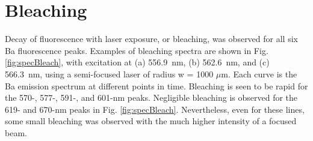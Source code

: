 


\section{Bleaching}
\label{sec:bleaching}

Decay of fluorescence with laser exposure, or bleaching, was observed for all six Ba fluorescence peaks.  Examples of bleaching spectra are shown in Fig. \ref{fig:specBleach}, with excitation at (a) 556.9~nm, (b) 562.6~nm, and (c) 566.3~nm, using a semi-focused laser of radius w = 1000 $\mu$m.  Each curve is the Ba emission spectrum at different points in time.  Bleaching is seen to be rapid for the 570-, 577-, 591-, and 601-nm peaks.  Negligible bleaching is observed for the 619- and 670-nm peaks in Fig. \ref{fig:specBleach}.  Nevertheless, even for these lines, some small bleaching was observed with the much higher intensity of a focused beam.


